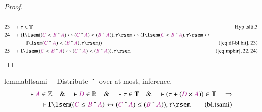 \begin{proof}
\begin{align}
  \\ 23 &&  & \vdash \tau \in \mathbf{T}&\text{Hyp~tslti.3}\notag%
  \\ 24 &&  & \vdash ( \mathbf{I} \lsem ( ( \mc{C} < \mc{B} ~\string^~ \mc{A} )
      \leftrightarrow ( \mc{C} ~\string^~ \mc{A} ) < (
      \mc{B} ~\string^~ \mc{A} ) ) , \tau \rsem
      \leftrightarrow ( \mathbf{I} \lsem ( \mc{C} < \mc{B}
      ~\string^~ \mc{A} ) , \tau \rsem \leftrightarrow  \notag \\ & & & \qquad
      \mathbf{I} \lsem ( \mc{C} ~\string^~ \mc{A} ) < (
      \mc{B} ~\string^~ \mc{A} ) , \tau \rsem )
      )&(\mbox{\ref{eq:df-bl.bit}},23)\notag
  \\ 25 &&  & \vdash \mathbf{I} \lsem ( ( \mc{C} < \mc{B} ~\string^~ \mc{A} )
      \leftrightarrow ( \mc{C} ~\string^~ \mc{A} ) < (
      \mc{B} ~\string^~ \mc{A} ) ) , \tau
      \rsem&(\mbox{\ref{eq:mpbir}},22,24)\notag
\end{align}
\end{proof}

\begin{restatable}{lemma}{bltsami}~~ Distribute $~\string^~$ over at-most,
inference.
\begin{align}
\vdash \mc{A} \in \mathbb{Z}\quad\&\quad \vdash \mc{D} \in
    \mathbb{R}\quad\&\quad \vdash \tau \in \mathbf{T}\quad\&\quad \vdash ( \tau
    + ( \mc{D} \times \mc{A} ) ) \in \mathbf{T}\quad\Rightarrow \notag \\
    \quad \vdash
    \mathbf{I} \lsem ( ( \mc{C} \le \mc{B} ~\string^~ \mc{A} ) \leftrightarrow
    ( \mc{C} ~\string^~ \mc{A} ) \le ( \mc{B} ~\string^~ \mc{A} ) ) , \tau
    \rsem\label{eq:bl.tsami}\tag{bl.tsami}
\end{align}
\end{restatable}

